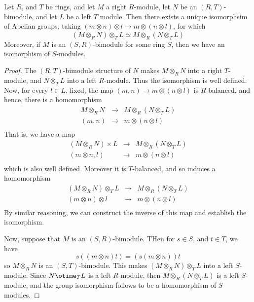 \begin{theorem}\label{4.4.9}
    Let $R$, and  $T$ be rings, and let $M$ a right  $R$-module, let $N$ be
    an  $(R,T)$-bimodule, and let $L$ be a left  $T$ module. Then there exists a
    unique isomorphsim of Abelian groups, taking $(m \otimes n) \otimes l
    \xrightarrow{} m \otimes (n \otimes l)$, for which
    \begin{equation*}
        (M \otimes_R N) \otimes_T L \simeq M \otimes_R (N \otimes_T L)
    \end{equation*}
    Moreover, if $M$ is an  $(S,R)$-bimodule for some ring $S$, then we have an
    isomorphism of $S$-modules.
\end{theorem}
\begin{proof}
    The $(R,T)$-bimodule structure of $N$ makes  $M \otimes_R N$ into a right
    $T$-module, and  $N \otimes_T L$ into a left  $R$-module. Thus the
    isomorphism is well defined. Now, for every  $l \in L$, fixed, the map
    $(m,n) \xrightarrow{} m \otimes (n \otimes l)$ is $R$-balanced, and hence,
    there is a homomorphism
    \begin{eqnarray*}
        M \otimes_R N & \xrightarrow{} & M \otimes_R (N \otimes_T L)    \\
        (m,n)   & \xrightarrow{} & m \otimes (n \otimes l)  \\
    \end{eqnarray*}
    That is, we have a map
    \begin{eqnarray*}
        (M \otimes_R N) \times L & \xrightarrow{} & M \otimes_R (N \otimes_T L)    \\
        (m \otimes n, l)   & \xrightarrow{} & m \otimes (n \otimes l)  \\
    \end{eqnarray*}
    which is also well defined. Moreover it is $T$-balanced, and so induces a
    homomorphism
    \begin{eqnarray*}
        (M \otimes_R N) \otimes_T L & \xrightarrow{}    &   M \otimes_R (N
                                                \otimes_T L)    \\
        (m \otimes n) \otimes l & \xrightarrow{}    &   m \otimes (n \otimes l) \\
    \end{eqnarray*}
    By similar reasoning, we can construct the inverse of this map and establish
    the isomorphism.

    Now, suppose that $M$ is an  $(S,R)$-bimodule. THen for $s \in S$, and $t
    \in T$, we have
    \begin{equation*}
        s((m \otimes n)t)=(s(m \otimes n))t
    \end{equation*}
    so $M \otimes_R N$ is an  $(S,T)$-bimodule. This makes $(M \otimes_R N)
    \otimes_T L$ into a left $S$-module. Since  $N \otime_T L$ is a left
    $R$-module, then  $M \otimes_R (N \otimes_T L)$ is a left $S$-module, and
    the group isomorphism follows to be a homomorphism of  $S$-modules.
\end{proof}
